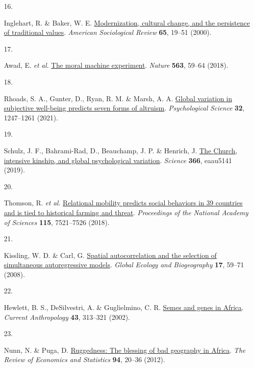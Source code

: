 \documentclass[
  man,floatsintext]{apa6}
\newlength{\cslhangindent}
\newlength{\csllabelwidth}
\newlength{\cslentryspacingunit} %
\newenvironment{CSLReferences}[2] %
 {%
  \setlength{\parindent}{0pt}
  \ifodd #1
  \let\oldpar\par
  \def\par{\hangindent=\cslhangindent\oldpar}
  \fi
  \setlength{\parskip}{#2\cslentryspacingunit}
 }%
 {}
\newcommand{\CSLLeftMargin}[1]{\parbox[t]{\csllabelwidth}{#1}}
\newcommand{\CSLRightInline}[1]{\parbox[t]{\linewidth - \csllabelwidth}{#1}\break}
\begin{document}
\begin{CSLReferences}{0}{0}
\leavevmode{}%
\CSLLeftMargin{16. }%
\CSLRightInline{Inglehart, R. \& Baker, W. E. \href{https://doi.org/10.2307/2657288}{Modernization, cultural change, and the persistence of traditional values}. \emph{American Sociological Review} \textbf{65}, 19--51 (2000).}

\leavevmode{}%
\CSLLeftMargin{17. }%
\CSLRightInline{Awad, E. \emph{et al.} \href{https://doi.org/10.1038/s41586-018-0637-6}{The moral machine experiment}. \emph{Nature} \textbf{563}, 59--64 (2018).}

\leavevmode{}%
\CSLLeftMargin{18. }%
\CSLRightInline{Rhoads, S. A., Gunter, D., Ryan, R. M. \& Marsh, A. A. \href{https://doi.org/10.1177/0956797621994767}{Global variation in subjective well-being predicts seven forms of altruism}. \emph{Psychological Science} \textbf{32}, 1247--1261 (2021).}

\leavevmode{}%
\CSLLeftMargin{19. }%
\CSLRightInline{Schulz, J. F., Bahrami-Rad, D., Beauchamp, J. P. \& Henrich, J. \href{https://doi.org/10.1126/science.aau5141}{The {C}hurch, intensive kinship, and global psychological variation}. \emph{Science} \textbf{366}, eaau5141 (2019).}

\leavevmode{}%
\CSLLeftMargin{20. }%
\CSLRightInline{Thomson, R. \emph{et al.} \href{https://doi.org/10.1073/pnas.1713191115}{Relational mobility predicts social behaviors in 39 countries and is tied to historical farming and threat}. \emph{Proceedings of the National Academy of Sciences} \textbf{115}, 7521--7526 (2018).}

\leavevmode{}%
\CSLLeftMargin{21. }%
\CSLRightInline{Kissling, W. D. \& Carl, G. \href{https://doi.org/10.1111/j.1466-8238.2007.00334.x}{Spatial autocorrelation and the selection of simultaneous autoregressive models}. \emph{Global Ecology and Biogeography} \textbf{17}, 59--71 (2008).}

\leavevmode{}%
\CSLLeftMargin{22. }%
\CSLRightInline{Hewlett, B. S., DeSilvestri, A. \& Guglielmino, C. R. \href{https://doi.org/10.1086/339379}{Semes and genes in {Africa}}. \emph{Current Anthropology} \textbf{43}, 313--321 (2002).}

\leavevmode{}%
\CSLLeftMargin{23. }%
\CSLRightInline{Nunn, N. \& Puga, D. \href{https://doi.org/10.1162/REST_a_00161}{Ruggedness: The blessing of bad geography in {A}frica}. \emph{The Review of Economics and Statistics} \textbf{94}, 20--36 (2012).}


\end{CSLReferences}
\end{document}
